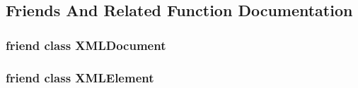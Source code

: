 \subsection{Friends And Related Function Documentation}
\hypertarget{classtinyxml2_1_1_x_m_l_node_a4eee3bda60c60a30e4e8cd4ea91c4c6e}{
\subsubsection[{X\-M\-L\-Document}]{\setlength{\rightskip}{0pt plus 5cm}friend class {\bf X\-M\-L\-Document}\hspace{0.3cm}{\ttfamily [friend]}}}\label{classtinyxml2_1_1_x_m_l_node_a4eee3bda60c60a30e4e8cd4ea91c4c6e}
\hypertarget{classtinyxml2_1_1_x_m_l_node_ac2fba9b6e452829dd892f7392c24e0eb}{
\subsubsection[{X\-M\-L\-Element}]{\setlength{\rightskip}{0pt plus 5cm}friend class {\bf X\-M\-L\-Element}\hspace{0.3cm}{\ttfamily [friend]}}}\label{classtinyxml2_1_1_x_m_l_node_ac2fba9b6e452829dd892f7392c24e0eb}


